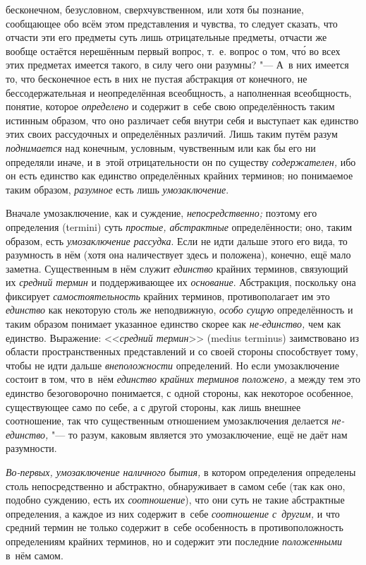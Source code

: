бесконечном, безусловном, сверхчувственном, или хотя бы познание,
сообщающее обо всём этом представления и чувства, то следует сказать, что
отчасти эти его предметы суть лишь отрицательные предметы, отчасти же
вообще остаётся нерешённым первый вопрос, т.~е. вопрос о том, чт\'{о} во всех
этих предметах имеется такого, в силу чего они разумны? "--- А~в них имеется
то, что бесконечное есть в них не пустая абстракция от конечного, не
бессодержательная и неопределённая всеобщность, а наполненная всеобщность,
понятие, которое {\em определено} и содержит в~себе свою определённость таким
истинным образом, что оно различает себя внутри себя и выступает как единство
этих своих рассудочных и определённых различий. Лишь таким путём разум
{\em поднимается} над конечным, условным, чувственным или как бы его ни
определяли иначе, и в~этой отрицательности он по существу {\em содержателен,}
ибо он есть единство как единство определённых крайних терминов; но понимаемое
таким образом, {\em разумное} есть лишь {\em умозаключение}.

Вначале умозаключение, как и суждение, {\em непосредственно;} поэтому его
определения (termini) суть {\em простые, абстрактные} определённости;
оно, таким образом, есть {\em умозаключение рассудка}. Если не идти дальше
этого его вида, то разумность в нём (хотя она наличествует здесь и положена),
конечно, ещё мало заметна. Существенным в нём служит {\em единство} крайних
терминов, связующий их {\em средний термин} и поддерживающее их
{\em основание}. Абстракция, поскольку она фиксирует {\em самостоятельность}
крайних терминов, противополагает им это {\em единство} как некоторую столь же
неподвижную, {\em особо сущую} определённость и таким образом понимает
указанное единство скорее как {\em не-единство,} чем как единство. Выражение:
<<{\em средний термин}>> (medius terminus) заимствовано из области
пространственных представлений и со своей стороны способствует тому, чтобы не
идти дальше {\em внеположности} определений. Но если умозаключение состоит в
том, что в~нём {\em единство крайних терминов положено,} а между тем это
единство безоговорочно понимается, с одной стороны, как некоторое особенное,
существующее само по себе, а с другой стороны, как лишь внешнее соотношение,
так что существенным отношением умозаключения делается {\em не-единство,} "---
то разум, каковым является это умозаключение, ещё не даёт нам разумности.

{\em Во-первых, умозаключение наличного бытия,}
в котором определения определены столь непосредственно и
абстрактно, обнаруживает в самом себе (так как оно, подобно суждению, есть
их {\em соотношение}), что они суть не такие абстрактные определения, а каждое
из них содержит в~себе {\em соотношение с~другим,} и что средний термин не
только содержит в~себе особенность в противоположность определениям крайних
терминов, но и содержит эти последние {\em положенными} в~нём самом.

